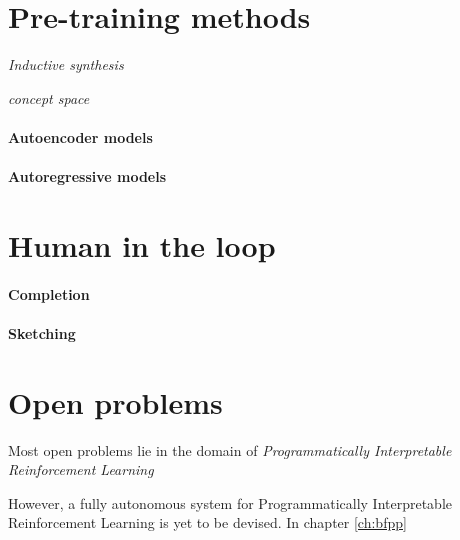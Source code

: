 \section{Pre-training methods}

\emph{Inductive synthesis}

\emph{concept space}

\paragraph{Autoencoder models}

\paragraph{Autoregressive models}

\section{Human in the loop}

\paragraph{Completion}

\paragraph{Sketching}

\section{Open problems}

Most open problems lie in the domain of \emph{Programmatically Interpretable Reinforcement Learning}

However, a fully autonomous system for Programmatically Interpretable Reinforcement Learning is yet to be devised. In chapter \ref{ch:bfpp}